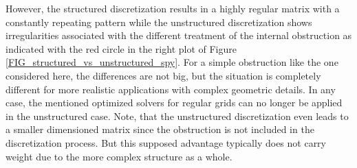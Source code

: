 However, the structured discretization results in a highly regular matrix with a constantly repeating pattern while the unstructured discretization shows irregularities associated with the different treatment of the internal obstruction as indicated with the red circle in the right plot of Figure \ref{FIG_structured_vs_unstructured_spy}. 
For a simple obstruction like the one considered here, the differences are not big, but the situation is completely different for more realistic applications with complex geometric details. In any case, the mentioned optimized solvers for regular grids can no longer be applied in the unstructured case.
Note, that the unstructured discretization even leads to a smaller dimensioned matrix since the obstruction is not included in the discretization process. But this supposed advantage typically does not carry weight due to the more complex structure as a whole.

